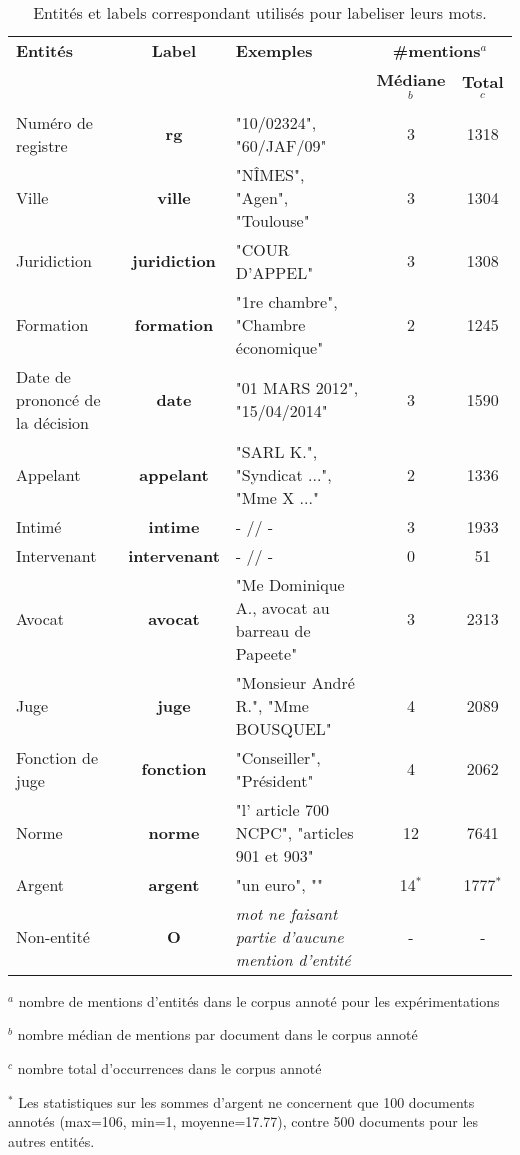 \begin{table}[!ht]
\scriptsize
\begin{tabular}[c]{|p{}|c|p{}|cc|}
\hline
\textbf{Entités} & \textbf{Label} & \textbf{Exemples} & \multicolumn{2}{c|}{\textbf{\#mentions}$^a$}\\
  & & & \textbf{Médiane}$^b$& \textbf{Total}$^c$ \\ \hline
Numéro de registre & \textbf{rg} & "10/02324", "60/JAF/09" & 3 & 1318\\ \hline
Ville & \textbf{ville}& "NÎMES", "Agen", "Toulouse" & 3 & 1304\\ \hline
Juridiction & \textbf{juridiction} & "COUR D'APPEL" & 3 & 1308\\ \hline
Formation & \textbf{formation} & "1re chambre", "Chambre économique" & 2 &  1245\\ \hline
Date de prononcé de la décision & \textbf{date} & "01 MARS 2012", "15/04/2014" & 3 & 1590\\ \hline
Appelant & \textbf{appelant} & "SARL K.", "Syndicat ...", "Mme X ..." & 2 & 1336 \\ \hline
Intimé & \textbf{intime} & - // - & 3 & 1933 \\ \hline
Intervenant & \textbf{intervenant} & - // - & 0 & 51 \\ \hline
Avocat & \textbf{avocat} & "Me Dominique A., avocat au barreau de Papeete" & 3 & 2313\\ \hline
Juge & \textbf{juge} & "Monsieur André R.", "Mme BOUSQUEL" & 4 & 2089\\ \hline
Fonction de juge & \textbf{fonction} & "Conseiller", "Président" & 4 & 2062\\ \hline
Norme & \textbf{norme} & "l' article 700 NCPC", "articles 901 et 903" & 12 & 7641 \\ \hline
Argent & \textbf{argent} & "un euro", "" & 14$^*$ & 1777$^*$ \\ \hline
\noalign{\smallskip}\hline\noalign{\smallskip}
Non-entité & \textbf{O} & \textit{mot ne faisant partie d'aucune mention d'entité} & - & -\\ \hline
\end{tabular} 

$^a$ nombre de mentions d'entités dans le corpus annoté pour les expérimentations

$^b$ nombre médian de mentions par document dans le corpus annoté

$^c$ nombre total d'occurrences dans le corpus annoté

$^*$ Les statistiques sur les sommes d'argent ne concernent que 100 documents annotés (max=106, min=1, moyenne=17.77), contre 500 documents pour les autres entités.
\caption{Entités et labels correspondant utilisés pour labeliser leurs mots. }\label{p4_relevantinfo}
\end{table}



